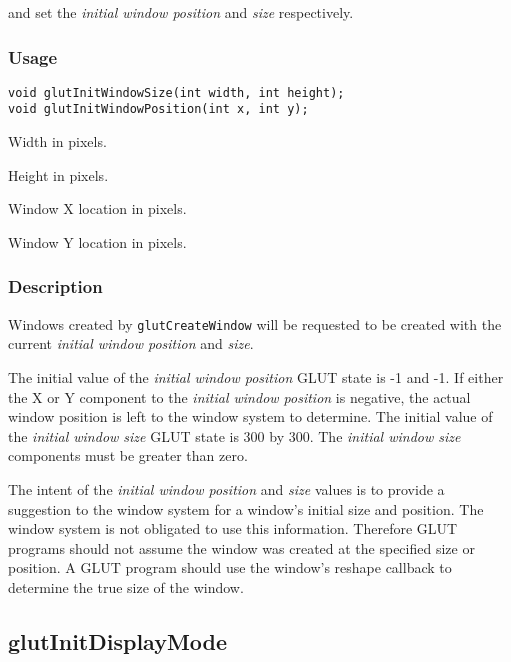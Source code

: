  and  set the
{\em initial window position} and {\em size} respectively.

\subsubsection*{Usage}

\begin{verbatim}
void glutInitWindowSize(int width, int height);
void glutInitWindowPosition(int x, int y);
\end{verbatim}
\begin{description}
\itemsep 0in
\item[\tt width]
Width in pixels.
\item[\tt height]
Height in pixels.
\item[\tt x]
Window X location in pixels.
\item[\tt y]
Window Y location in pixels.
\end{description}

\subsubsection*{Description}

Windows created by {\tt glutCreateWindow} will be requested to be created
with the current {\em initial window position} and {\em size}.

The initial value of the {\em initial window position} GLUT state is
-1 and -1.  If either the X or Y component to the {\em initial
window position} is negative, the actual window position is left
to the window system to determine.
The initial value of the {\em initial window size} GLUT state is 300 by 300.
The {\em initial window size} components must be greater than zero.

The intent of the {\em initial window position} and {\em size} values is
to provide a suggestion to the window system for a window's initial size
and position.  The window system is not obligated to use this information.
Therefore GLUT programs should not assume the window was created at the
specified size or position.  A GLUT program should use the window's
reshape callback to determine the true size of the window.

\subsection{glutInitDisplayMode}

